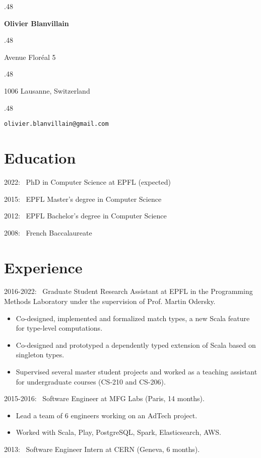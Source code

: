 \documentclass[marginmode, 11pt]{res}
\newcommand{\centered}[1]{\moveleft.48\hoffset\centerline{#1}}
\renewcommand{\:}[0]{:~}
\begin{document}
\centered{\LARGE\textbf{Olivier Blanvillain}}
\vspace{10pt}

\centered{Avenue Floréal 5}
\centered{1006 Lausanne, Switzerland}
\vspace{3pt}
\vspace{2pt}
\centered{\texttt{olivier.blanvillain@gmail.com}}

\begin{resume}

\section{Education}

2022\: PhD in Computer Science at EPFL (expected)

2015\: EPFL Master's degree in Computer Science

2012\: EPFL Bachelor's degree in Computer Science

2008\: French Baccalaureate

\section{Experience}

2016-2022\: Graduate Student Research Assistant at EPFL in the Programming Methods Laboratory under the supervision of Prof. Martin Odersky.

\begin{itemize}
  \item Co-designed, implemented and formalized match types, a new Scala feature for type-level computations.
  \item Co-designed and prototyped a dependently typed extension of Scala based on singleton types.
  \item Supervised several master student projects and worked as a teaching assistant for undergraduate courses (CS-210 and CS-206).
\end{itemize}

2015-2016\: Software Engineer at MFG Labs (Paris, 14 months).

\begin{itemize}
  \item Lead a team of 6 engineers working on an AdTech project.
  \item Worked with Scala, Play, PostgreSQL, Spark, Elasticsearch, AWS.
\end{itemize}

2013\: Software Engineer Intern at CERN (Geneva, 6 months).


\end{resume}
\end{document}
